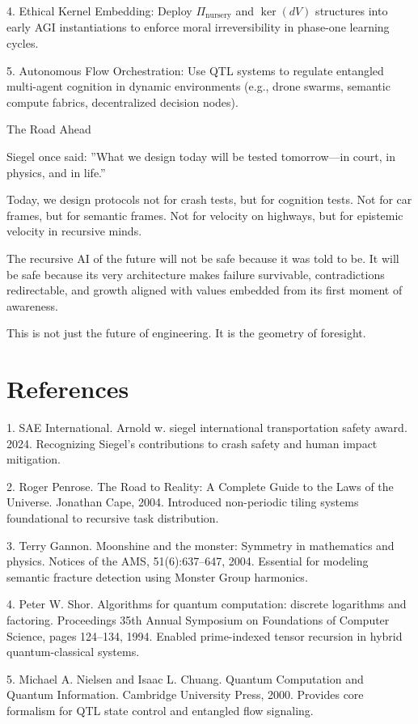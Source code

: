 \documentclass[11pt]{article}
\begin{document}
4. Ethical Kernel Embedding: Deploy $\Pi_{\text{nursery}}$ and $\ker(dV)$ structures into early AGI instantiations to enforce moral irreversibility in phase-one learning cycles.

5. Autonomous Flow Orchestration: Use QTL systems to regulate entangled multi-agent cognition in dynamic environments (e.g., drone swarms, semantic compute fabrics, decentralized decision nodes).

The Road Ahead

Siegel once said: ”What we design today will be tested tomorrow—in court, in physics, and in life.”

Today, we design protocols not for crash tests, but for cognition tests. Not for car frames, but for semantic frames. Not for velocity on highways, but for epistemic velocity in recursive minds.

The recursive AI of the future will not be safe because it was told to be. It will be safe because its very architecture makes failure survivable, contradictions redirectable, and growth aligned with values embedded from its first moment of awareness.

This is not just the future of engineering. It is the geometry of foresight.

\section*{References}
1. SAE International. Arnold w. siegel international transportation safety award. 2024. Recognizing Siegel’s contributions to crash safety and human impact mitigation.

2. Roger Penrose. The Road to Reality: A Complete Guide to the Laws of the Universe. Jonathan Cape, 2004. Introduced non-periodic tiling systems foundational to recursive task distribution.

3. Terry Gannon. Moonshine and the monster: Symmetry in mathematics and physics. Notices of the AMS, 51(6):637–647, 2004. Essential for modeling semantic fracture detection using Monster Group harmonics.

4. Peter W. Shor. Algorithms for quantum computation: discrete logarithms and factoring. Proceedings 35th Annual Symposium on Foundations of Computer Science, pages 124–134, 1994. Enabled prime-indexed tensor recursion in hybrid quantum-classical systems.

5. Michael A. Nielsen and Isaac L. Chuang. Quantum Computation and Quantum Information. Cambridge University Press, 2000. Provides core formalism for QTL state control and entangled flow signaling.
\end{document}
